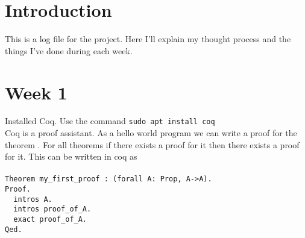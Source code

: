 \documentclass{article}
\begin{document}
\section{Introduction}
This is a log file for the project. Here I'll explain my thought process and the things I've done during each week.
\section{Week 1}
Installed Coq. Use the command \verb|sudo apt install coq|\\
Coq is a proof assistant. As a hello world program we can write a proof for the theorem . For all theorems if there exists a proof for it then there exists a proof for it. This can be written in coq as\\ \\
\verb|Theorem my_first_proof : (forall A: Prop, A->A).|\\
\verb|Proof.|\\
\verb|	intros A.|\\
\verb|	intros proof_of_A.|\\
\verb|	exact proof_of_A.|\\
\verb|Qed.|\\
\end{document}
